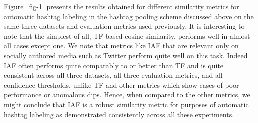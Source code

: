 \documentclass{sig-alternate}
\begin{document}
Figure~\ref{fig-1} presents the results obtained for different
similarity metrics for automatic hashtag labeling in the hashtag
pooling scheme discussed above on the same three datasets and
evaluation metrics used previously.  It is interesting to note that
the simplest of all, TF-based cosine similarity, performs well in
almost all cases except one.  We note that metrics like IAF that are
relevant only on socially authored media such as Twitter perform quite
well on this task.  Indeed IAF often performs quite comparably to or
better than TF and is quite consistent across all three datasets, all
three evaluation metrics, and all confidence thresholds, unlike TF and
other metrics which show cases of poor performance or anomalous
dips.  Hence, when compared to the other metrics, we might conclude
that IAF is a robust similarity metric for purposes of automatic
hashtag labeling as demonstrated consistently across all these experiments.
\end{document}
